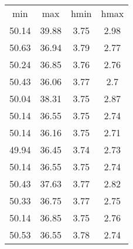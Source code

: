 \begin{table}
\begin{tabular}{cccc}
min & max & hmin & hmax \\
50.14 & 39.88 & 3.75 & 2.98 \\
50.63 & 36.94 & 3.79 & 2.77 \\
50.24 & 36.85 & 3.76 & 2.76 \\
50.43 & 36.06 & 3.77 & 2.7 \\
50.04 & 38.31 & 3.75 & 2.87 \\
50.14 & 36.55 & 3.75 & 2.74 \\
50.14 & 36.16 & 3.75 & 2.71 \\
49.94 & 36.45 & 3.74 & 2.73 \\
50.14 & 36.55 & 3.75 & 2.74 \\
50.43 & 37.63 & 3.77 & 2.82 \\
50.33 & 36.75 & 3.77 & 2.75 \\
50.14 & 36.85 & 3.75 & 2.76 \\
50.53 & 36.55 & 3.78 & 2.74 \\
\end{tabular}
\end{table}
